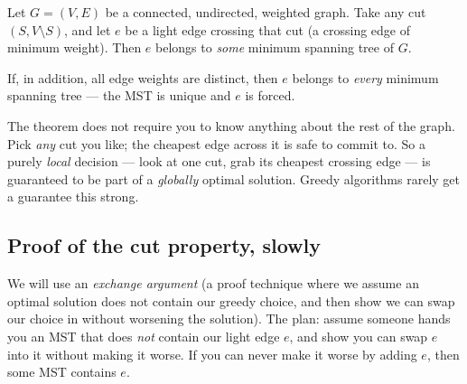 \begin{theorem}\label{ch23:thm-cut}
Let $G=(V,E)$ be a connected, undirected, weighted graph. Take any cut
$(S, V\setminus S)$, and let $e$ be a light edge crossing that cut (a crossing
edge of minimum weight). Then $e$ belongs to \emph{some} minimum spanning tree of
$G$.

If, in addition, all edge weights are distinct, then $e$ belongs to \emph{every}
minimum spanning tree --- the MST is unique and $e$ is forced.
\end{theorem}

The theorem does not require you to know anything about the
rest of the graph. Pick \emph{any} cut you like; the cheapest edge across it is
safe to commit to. So a purely \emph{local} decision --- look at
one cut, grab its cheapest crossing edge --- is guaranteed to be part of a
\emph{globally} optimal solution. Greedy algorithms rarely get a guarantee this
strong.

\subsection{Proof of the cut property, slowly}

We will use an \emph{exchange argument} (a proof technique where we assume an optimal solution does not contain our greedy choice, and then show we can swap our choice in without worsening the solution). The plan: assume someone hands you an MST that does
\emph{not} contain our light edge $e$, and show you can swap $e$ into it without
making it worse. If you can never make it worse by adding $e$, then some MST
contains $e$.

